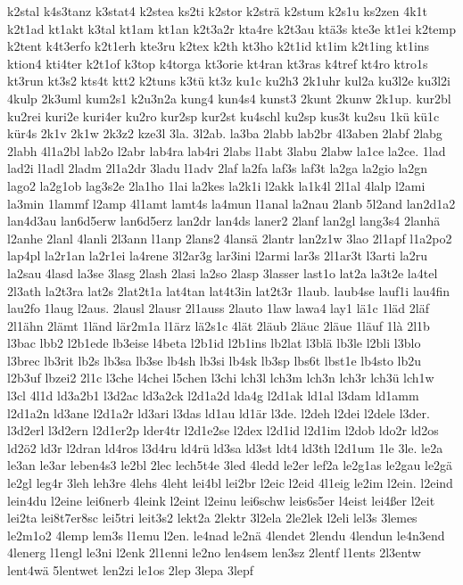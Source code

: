 {k2stal
k4s3tanz
k3stat4
k2stea
ks2ti
k2stor
k2strä
k2stum
k2s1u
ks2zen
4k1t
k2t1ad
kt1akt
k3tal
kt1am
kt1an
k2t3a2r
kta4re
k2t3au
ktä3s
kte3e
kt1ei
k2temp
k2tent
k4t3erfo
k2t1erh
kte3ru
k2tex
k2th
kt3ho
k2t1id
kt1im
k2t1ing
kt1ins
ktion4
kti4ter
k2t1of
k3top
k4torga
kt3orie
kt4ran
kt3ras
k4tref
kt4ro
ktro1s
kt3run
kt3s2
kts4t
ktt2
k2tuns
k3tü
kt3z
ku1c
ku2h3
2k1uhr
kul2a
ku3l2e
ku3l2i
4kulp
2k3uml
kum2s1
k2u3n2a
kung4
kun4s4
kunst3
2kunt
2kunw
2k1up.
kur2bl
ku2rei
kuri2e
kuri4er
ku2ro
kur2sp
kur2st
ku4schl
ku2sp
kus3t
ku2su
1kü
kü1c
kür4s
2k1v
2k1w
2k3z2
kze3l
3la.
3l2ab.
la3ba
2labb
lab2br
4l3aben
2labf
2labg
2labh
4l1a2bl
lab2o
l2abr
lab4ra
lab4ri
2labs
l1abt
3labu
2labw
la1ce
la2ce.
1lad
lad2i
l1adl
2ladm
2l1a2dr
3ladu
l1adv
2laf
la2fa
laf3s
laf3t
la2ga
la2gio
la2gn
lago2
la2g1ob
lag3s2e
2la1ho
1lai
la2kes
la2k1i
l2akk
la1k4l
2l1al
4lalp
l2ami
la3min
1lammf
l2amp
4l1amt
lamt4s
la4mun
l1anal
la2nau
2lanb
5l2and
lan2d1a2
lan4d3au
lan6d5erw
lan6d5erz
lan2dr
lan4ds
laner2
2lanf
lan2gl
lang3s4
2lanhä
l2anhe
2lanl
4lanli
2l3ann
l1anp
2lans2
4lansä
2lantr
lan2z1w
3lao
2l1apf
l1a2po2
lap4pl
la2r1an
la2r1ei
la4rene
3l2ar3g
lar3ini
l2armi
lar3s
2l1ar3t
l3arti
la2ru
la2sau
4lasd
la3se
3lasg
2lash
2lasi
la2so
2lasp
3lasser
last1o
lat2a
la3t2e
la4tel
2l3ath
la2t3ra
lat2s
2lat2t1a
lat4tan
lat4t3in
lat2t3r
1laub.
laub4se
lauf1i
lau4fin
lau2fo
1laug
l2aus.
2lausl
2lausr
2l1auss
2lauto
1law
lawa4
lay1
lä1c
1läd
2läf
2l1ähn
2lämt
1länd
lär2m1a
l1ärz
lä2s1c
4lät
2läub
2läuc
2läue
1läuf
1là
2l1b
l3bac
lbb2
l2b1ede
lb3eise
l4beta
l2b1id
l2b1ins
lb2lat
l3blä
lb3le
l2bli
l3blo
l3brec
lb3rit
lb2s
lb3sa
lb3se
lb4sh
lb3si
lb4sk
lb3sp
lbs6t
lbst1e
lb4sto
lb2u
l2b3uf
lbzei2
2l1c
l3che
l4chei
l5chen
l3chi
lch3l
lch3m
lch3n
lch3r
lch3ü
lch1w
l3cl
4l1d
ld3a2b1
l3d2ac
ld3a2ck
l2d1a2d
lda4g
l2d1ak
ld1al
l3dam
ld1amm
l2d1a2n
ld3ane
l2d1a2r
ld3ari
l3das
ld1au
ld1är
l3de.
l2deh
l2dei
l2dele
l3der.
l3d2erl
l3d2ern
l2d1er2p
lder4tr
l2d1e2se
l2dex
l2d1id
l2d1im
l2dob
ldo2r
ld2os
ld2ö2
ld3r
l2dran
ld4ros
l3d4ru
ld4rü
ld3sa
ld3st
ldt4
ld3th
l2d1um
1le
3le.
le2a
le3an
le3ar
leben4s3
le2bl
2lec
lech5t4e
3led
4ledd
le2er
lef2a
le2g1as
le2gau
le2gä
le2gl
leg4r
3leh
leh3re
4lehs
4leht
lei4bl
lei2br
l2eic
l2eid
4l1eig
le2im
l2ein.
l2eind
lein4du
l2eine
lei6nerb
4leink
l2eint
l2einu
lei6schw
leis6s5er
l4eist
lei4ßer
l2eit
lei2ta
lei8t7er8sc
lei5tri
leit3s2
lekt2a
2lektr
3l2ela
2le2lek
l2eli
lel3s
3lemes
le2m1o2
4lemp
lem3s
l1emu
l2en.
le4nad
le2nä
4lendet
2lendu
4lendun
le4n3end
4lenerg
l1engl
le3ni
l2enk
2l1enni
le2no
len4sem
len3sz
2lentf
l1ents
2l3entw
lent4wä
5lentwet
len2zi
le1os
2lep
3lepa
3lepf
}
